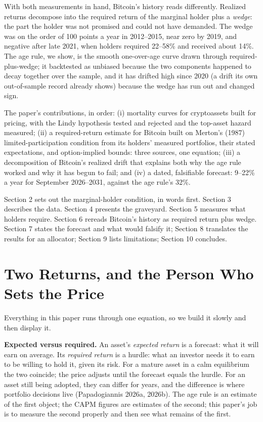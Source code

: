 \documentclass[11pt]{article}
\begin{document}
With both measurements in hand, Bitcoin's history reads differently. Realized returns decompose into the required return of the marginal holder plus a \emph{wedge}: the part the holder was not promised and could not have demanded. The wedge was on the order of 100 points a year in 2012--2015, near zero by 2019, and negative after late 2021, when holders required 22--58\% and received about 14\%. The age rule, we show, is the smooth one-over-age curve drawn through required-plus-wedge; it backtested as unbiased because the two components happened to decay together over the sample, and it has drifted high since 2020 (a drift its own out-of-sample record already shows) because the wedge has run out and changed sign.

The paper's contributions, in order: (i) mortality curves for cryptoassets built for pricing, with the Lindy hypothesis tested and rejected and the top-asset hazard measured; (ii) a required-return estimate for Bitcoin built on Merton's (1987) limited-participation condition from its holders' measured portfolios, their stated expectations, and option-implied bounds: three sources, one equation; (iii) a decomposition of Bitcoin's realized drift that explains both why the age rule worked and why it has begun to fail; and (iv) a dated, falsifiable forecast: 9--22\% a year for September 2026--2031, against the age rule's 32\%.

Section 2 sets out the marginal-holder condition, in words first. Section 3 describes the data. Section 4 presents the graveyard. Section 5 measures what holders require. Section 6 rereads Bitcoin's history as required return plus wedge. Section 7 states the forecast and what would falsify it; Section 8 translates the results for an allocator; Section 9 lists limitations; Section 10 concludes.

\section{Two Returns, and the Person Who Sets the Price}

Everything in this paper runs through one equation, so we build it slowly and then display it.

\textbf{Expected versus required.} An asset's \emph{expected return} is a forecast: what it will earn on average. Its \emph{required return} is a hurdle: what an investor needs it to earn to be willing to hold it, given its risk. For a mature asset in a calm equilibrium the two coincide; the price adjusts until the forecast equals the hurdle. For an asset still being adopted, they can differ for years, and the difference is where portfolio decisions live (Papadogiannis 2026a, 2026b). The age rule is an estimate of the first object; the CAPM figures are estimates of the second; this paper's job is to measure the second properly and then see what remains of the first.
\end{document}
